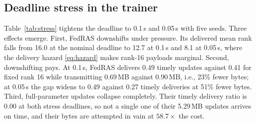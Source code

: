 \documentclass[preprint,12pt]{elsarticle}
\begin{document}
\subsection{Deadline stress in the trainer}
Table~\ref{tab:stress} tightens the deadline to 0.1\,s and 0.05\,s with five seeds. Three effects emerge. First, FedRAS downshifts under pressure. Its delivered mean rank falls from 16.0 at the nominal deadline to 12.7 at 0.1\,s and 8.1 at 0.05\,s, where the delivery hazard \eqref{eq:hazard} makes rank-16 payloads marginal. Second, downshifting pays. At 0.1\,s, FedRAS delivers 0.49 timely updates against 0.41 for fixed rank 16 while transmitting 0.69\,MB against 0.90\,MB, i.e., 23\% fewer bytes; at 0.05\,s the gap widens to 0.49 against 0.27 timely deliveries at 51\% fewer bytes. Third, full-parameter updates collapse completely. Their timely delivery ratio is 0.00 at both stress deadlines, so not a single one of their 5.29\,MB updates arrives on time, and their bytes are attempted in vain at $58.7\times$ the cost.

\begin{table}[t]
\centering
\caption{Real trainer under deadline stress with five seeds. Accuracy is the round-40 mean and standard deviation. Timely delivery ratio, bytes per round, and mean delivered rank are averaged over rounds 30 to 39 at real serialized sizes.}
\label{tab:stress}
\end{table}
\end{document}
